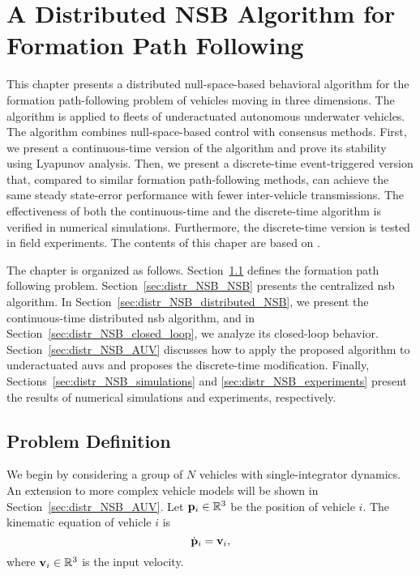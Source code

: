 \chapter{A Distributed NSB Algorithm for Formation Path Following}
\label{chap:distr_NSB}

This chapter presents a distributed null-space-based behavioral algorithm for the formation path-following problem of vehicles moving in three dimensions.
The algorithm is applied to fleets of underactuated autonomous underwater vehicles.
The algorithm combines null-space-based control with consensus methods.
First, we present a continuous-time version of the algorithm and prove its stability using Lyapunov analysis.
Then, we present a discrete-time event-triggered version that, compared to similar formation path-following methods, can achieve the same steady state-error performance with fewer inter-vehicle transmissions.
The effectiveness of both the continuous-time and the discrete-time algorithm is verified in numerical simulations.
Furthermore, the discrete-time version is tested in field experiments.  
The contents of this chaper are based on \cite{matous_singularity_2023}.

The chapter is organized as follows.
Section~\ref{sec:distr_NSB_problem} defines the formation path following problem.
Section~\ref{sec:distr_NSB_NSB} presents the centralized \gls{nsb} algorithm.
In Section~\ref{sec:distr_NSB_distributed_NSB}, we present the continuous-time distributed \gls{nsb} algorithm, and in Section~\ref{sec:distr_NSB_closed_loop}, we analyze its closed-loop behavior.
Section~\ref{sec:distr_NSB_AUV} discusses how to apply the proposed algorithm to underactuated \glspl{auv} and proposes the discrete-time modification.
Finally, Sections~\ref{sec:distr_NSB_simulations} and \ref{sec:distr_NSB_experiments} present the results of numerical simulations and experiments, respectively.

\section{Problem Definition}
\label{sec:distr_NSB_problem}
We begin by considering a group of $N$ vehicles with single-integrator dynamics.
An extension to more complex vehicle models will be shown in Section~\ref{sec:distr_NSB_AUV}.
Let $\mathbf{p}_i \in \mathbb{R}^3$ be the position of vehicle $i$.
The kinematic equation of vehicle $i$ is
\begin{equation}
    \dot{\mathbf{p}}_i = \mathbf{v}_i,
    \label{eq:distr_NSB_kinematics}
\end{equation}
where $\mathbf{v}_i \in \mathbb{R}^3$ is the input velocity.

